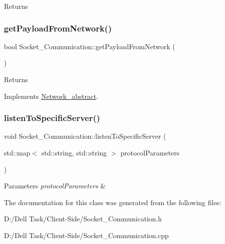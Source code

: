 \begin{DoxyReturn}{Returns}

\end{DoxyReturn}
\mbox{\label{class_socket___communication_ab2983a743859588e4a1ca18a710d3fc9}} 
\subsubsection{\texorpdfstring{get\+Payload\+From\+Network()}{getPayloadFromNetwork()}}
{\footnotesize\ttfamily bool Socket\+\_\+\+Communication\+::get\+Payload\+From\+Network (\begin{DoxyParamCaption}{ }\end{DoxyParamCaption})\hspace{0.3cm}{\ttfamily [virtual]}}





\begin{DoxyReturn}{Returns}

\end{DoxyReturn}


Implements \mbox{\hyperlink{class_network__abstract}{Network\+\_\+abstract}}.

\mbox{\label{class_socket___communication_a9a405d090685fd6ba13bd857802bd591}} 
\subsubsection{\texorpdfstring{listen\+To\+Specific\+Server()}{listenToSpecificServer()}}
{\footnotesize\ttfamily void Socket\+\_\+\+Communication\+::listen\+To\+Specific\+Server (\begin{DoxyParamCaption}\item[{std\+::map$<$ std\+::string, std\+::string $>$}]{protocol\+Parameters }\end{DoxyParamCaption})}






\begin{DoxyParams}{Parameters}
{\em protocol\+Parameters} & \\
\hline
\end{DoxyParams}


The documentation for this class was generated from the following files\+:\begin{DoxyCompactItemize}
\item 
D\+:/\+Dell Task/\+Client-\/\+Side/Socket\+\_\+\+Communication.\+h\item 
D\+:/\+Dell Task/\+Client-\/\+Side/Socket\+\_\+\+Communication.\+cpp\end{DoxyCompactItemize}
